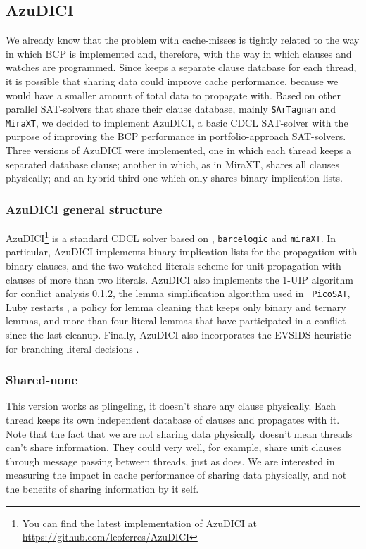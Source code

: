 \subsection{AzuDICI}
\label{sec:azudici}

We already know that the problem with cache-misses is tightly related
to the way in which BCP is implemented \cite{ZhangMalik2003SAT} and,
therefore, with the way in which clauses and watches are programmed.
Since \pling keeps a separate clause database for each thread, it is 
possible that sharing data could improve cache performance, because
we would have a smaller amount of total data to propagate with.
Based on other parallel SAT-solvers that share their clause database, 
mainly {\tt SArTagnan} and {\tt MiraXT}, we decided to implement AzuDICI, 
a basic CDCL SAT-solver with the purpose of improving the BCP performance
in portfolio-approach SAT-solvers.
Three versions of AzuDICI were implemented, one in which each thread keeps
a separated database clause; another in which, as in MiraXT, shares all
clauses physically; and an hybrid third one which only shares binary
implication lists.

\subsubsection{AzuDICI general structure}

AzuDICI\footnote{You can find the latest implementation of AzuDICI at
  \url{https://github.com/leoferres/AzuDICI}} is a standard CDCL
solver based on \pling, {\tt barcelogic} and {\tt miraXT}.
In particular, AzuDICI implements binary implication lists for the
propagation with binary clauses, and the two-watched literals scheme
for unit propagation \cite{} with clauses of more than two
literals. AzuDICI also implements the 1-UIP algorithm for conflict
analysis \ref{}, the lemma simplification algorithm used in {\tt
  PicoSAT}, Luby restarts \cite{}, a policy for lemma cleaning that
keeps only binary and ternary lemmas, and more than four-literal
lemmas that have participated in a conflict since the last
cleanup. Finally, AzuDICI also incorporates the EVSIDS heuristic for
branching literal decisions \cite{}.

\subsubsection{Shared-none}

This version works as plingeling, it doesn't share any clause physically. 
Each thread keeps its own independent database of clauses and propagates 
with it. Note that the fact that we are not sharing data physically 
doesn't mean threads can't share information. They could very well, for 
example, share unit clauses through message passing between threads, just 
as \pling does. We are interested in measuring the impact in cache 
performance of sharing data physically, and not the benefits of sharing 
information by it self.

